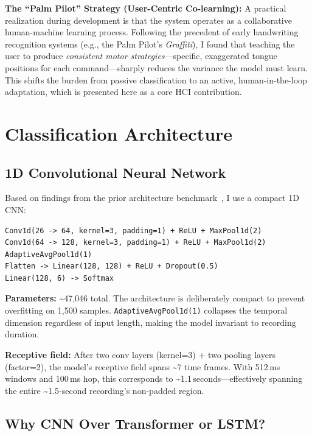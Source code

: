 \documentclass[11pt, a4paper]{article}
\begin{document}
\textbf{The ``Palm Pilot'' Strategy (User-Centric Co-learning):} A practical realization during development is that the system operates as a collaborative human-machine learning process. Following the precedent of early handwriting recognition systems (e.g., the Palm Pilot's \emph{Graffiti}), I found that teaching the user to produce \emph{consistent motor strategies}---specific, exaggerated tongue positions for each command---sharply reduces the variance the model must learn. This shifts the burden from passive classification to an active, human-in-the-loop adaptation, which is presented here as a core HCI contribution.

\section{Classification Architecture}
\label{sec:architecture}

\subsection{1D Convolutional Neural Network}

Based on findings from the prior architecture benchmark~\cite{kho2026prior}, I use a compact 1D CNN:

\begin{verbatim}
Conv1d(26 -> 64, kernel=3, padding=1) + ReLU + MaxPool1d(2)
Conv1d(64 -> 128, kernel=3, padding=1) + ReLU + MaxPool1d(2)
AdaptiveAvgPool1d(1)
Flatten -> Linear(128, 128) + ReLU + Dropout(0.5)
Linear(128, 6) -> Softmax
\end{verbatim}

\textbf{Parameters:} \textasciitilde47{,}046 total. The architecture is deliberately compact to prevent overfitting on 1{,}500 samples. \texttt{AdaptiveAvgPool1d(1)} collapses the temporal dimension regardless of input length, making the model invariant to recording duration.

\textbf{Receptive field:} After two conv layers (kernel=3) + two pooling layers (factor=2), the model's receptive field spans \textasciitilde7 time frames. With 512\,ms windows and 100\,ms hop, this corresponds to \textasciitilde1.1\,seconds---effectively spanning the entire \textasciitilde1.5-second recording's non-padded region.

\subsection{Why CNN Over Transformer or LSTM?}
\end{document}

